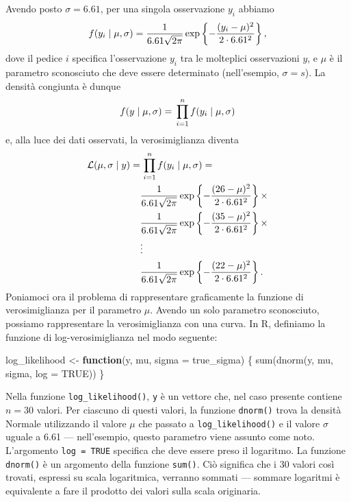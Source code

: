 \documentclass[
  10pt,
  italian,
  a4paper,
  extrafontsizes,onecolumn,openright
  ]{memoir}
\newenvironment{Shaded}{\begin{snugshade}}{\end{snugshade}}
\newcommand{\AttributeTok}[1]{\textcolor[rgb]{0.77,0.63,0.00}{#1}}
\newcommand{\ConstantTok}[1]{\textcolor[rgb]{0.00,0.00,0.00}{#1}}
\newcommand{\ControlFlowTok}[1]{\textcolor[rgb]{0.13,0.29,0.53}{\textbf{#1}}}
\newcommand{\FunctionTok}[1]{\textcolor[rgb]{0.00,0.00,0.00}{#1}}
\newcommand{\NormalTok}[1]{#1}
\newcommand{\OtherTok}[1]{\textcolor[rgb]{0.56,0.35,0.01}{#1}}
\newcommand{\R}{\textsf{R}} %
\theoremstyle{definition}
\theoremstyle{definition}
\theoremstyle{definition}
\theoremstyle{definition}
\theoremstyle{remark}
\begin{document}
Avendo posto \(\sigma = 6.61\), per una singola osservazione \(y_i\) abbiamo
\[
f(y_i \mid \mu, \sigma) = \frac{1}{{6.61 \sqrt {2\pi}}}\exp\left\{{-\frac{(y_i - \mu)^2}{2\cdot 6.61^2}}\right\},\notag
\]
dove il pedice \(i\) specifica l'osservazione \(y_i\) tra le molteplici osservazioni \(y\), e \(\mu\) è il parametro sconosciuto che deve essere determinato (nell'esempio, \(\sigma = s\)). La densità congiunta è dunque
\[
f(y \mid \mu, \sigma) = \, \prod_{i=1}^n f(y_i \mid \mu, \sigma)\notag
\]
e, alla luce dei dati osservati, la verosimiglianza diventa
\[
\begin{aligned}
\mathcal{L}(\mu, \sigma \mid y) =& \, \prod_{i=1}^n f(y_i \mid \mu, \sigma) = \notag\\
& \frac{1}{{6.61 \sqrt {2\pi}}}\exp\left\{{-\frac{(26 - \mu)^2}{2\cdot 6.61^2}}\right\} \times \notag\\
 & \frac{1}{{6.61 \sqrt {2\pi}}}\exp\left\{{-\frac{(35 - \mu)^2}{2\cdot 6.61^2}}\right\} \times  \notag\\
& \vdots \notag\\
 & \frac{1}{{6.61 \sqrt {2\pi}}}\exp\left\{{-\frac{(22 - \mu)^2}{2\cdot 6.61^2}}\right\}.
\end{aligned}
\label{eq:lldepression}
\]
Poniamoci ora il problema di rappresentare graficamente la funzione di verosimiglianza per il parametro \(\mu\). Avendo un solo parametro sconosciuto, possiamo rappresentare la verosimiglianza con una curva. In \R, definiamo la funzione di log-verosimiglianza nel modo seguente:

\begin{Shaded}
\begin{Highlighting}[]
\NormalTok{log\_likelihood }\OtherTok{\textless{}{-}} \ControlFlowTok{function}\NormalTok{(y, mu, }\AttributeTok{sigma =}\NormalTok{ true\_sigma) \{}
  \FunctionTok{sum}\NormalTok{(}\FunctionTok{dnorm}\NormalTok{(y, mu, sigma, }\AttributeTok{log =} \ConstantTok{TRUE}\NormalTok{))}
\NormalTok{\}}
\end{Highlighting}
\end{Shaded}

Nella funzione \texttt{log\_likelihood()}, \texttt{y} è un vettore che, nel caso presente contiene \(n = 30\) valori. Per ciascuno di questi valori, la funzione \texttt{dnorm()} trova la densità Normale utilizzando il valore \(\mu\) che passato a \texttt{log\_likelihood()} e il valore \(\sigma\) uguale a 6.61 --- nell'esempio, questo parametro viene assunto come noto. L'argomento \texttt{log\ =\ TRUE} specifica che deve essere preso il logaritmo. La funzione \texttt{dnorm()} è un argomento della funzione \texttt{sum()}. Ciò significa che i 30 valori così trovati, espressi su scala logaritmica, verranno sommati --- sommare logaritmi è equivalente a fare il prodotto dei valori sulla scala originaria.
\end{document}

